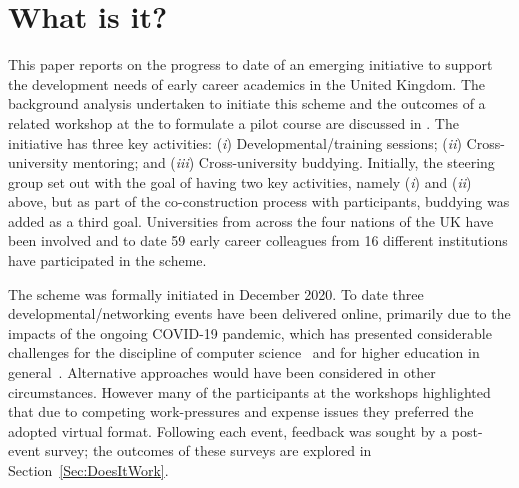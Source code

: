 \documentclass[sigconf]{acmart}
\begin{document}
\maketitle
\section{What is it?}	
\label{sec:What}
This paper reports on the progress to date of an emerging initiative
to support the development needs of early career academics in the
United Kingdom. The background analysis undertaken to initiate this
scheme and the outcomes of a related workshop at the  to formulate a pilot course are
discussed in . The initiative has three key
activities: ({\emph{i}}) Developmental/training sessions;
({\emph{ii}}) Cross-university mentoring; and ({\emph{iii}})
Cross-university buddying. Initially, the steering group set out with
the goal of having two key activities, namely ({\emph{i}}) and
({\emph{ii}}) above, but as part of the co-construction process with
participants, buddying was added as a third goal. Universities from
across the four nations of the UK have been involved and to date 59
early career colleagues from 16 different institutions have
participated in the scheme.

The scheme was formally initiated in December 2020. To date three
developmental/networking events have been delivered online, primarily
due to the impacts of the ongoing COVID-19 pandemic, which has
presented considerable challenges for the discipline of computer
science~\cite{crick-et-al:ukicer2020,wg1:iticse2021,prickett-et-al:iticse2020}
and for higher education in
general~\cite{watermeyer-et-al:he2020,CrickCovidUK}. Alternative
approaches would have been considered in other circumstances. However
many of the participants at the workshops highlighted that due to
competing work-pressures and expense issues they preferred the adopted
virtual format. Following each event, feedback was sought by a
post-event survey; the outcomes of these surveys are explored in
Section~\ref{Sec:DoesItWork}.
\end{document}
